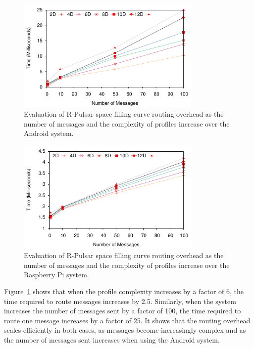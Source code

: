 

\begin{figure}[h!]
  \includegraphics[width=0.8\textwidth]{Results/Phone}
  \caption{Evaluation of R-Pulsar space filling curve routing overhead as the number of messages and the complexity of profiles increase over the Android system.}
  \label{fig:Phone}
\end{figure}

\begin{figure}[h!]
  \includegraphics[width=0.8\textwidth]{Results/Raspberry}
  \caption{Evaluation of R-Pulsar space filling curve routing overhead as the number of messages and the complexity of profiles increase over the Raspberry Pi system.}
  \label{fig:Raspberri}
\end{figure}

Figure~\ref{fig:Phone} shows that when the profile complexity increases by a factor of 6, the time required to route messages increases by 2.5. Similarly, when the system increases the number of messages sent by a factor of 100, the time required to route one message increases by a factor of 25. It shows that the routing overhead scales efficiently in both cases, as messages become increasingly complex and as the number of messages sent increases when using the Android system. 

